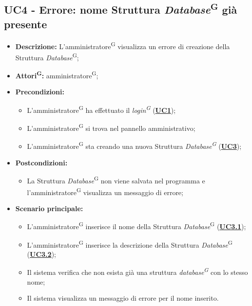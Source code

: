 \subsection{UC4 - Errore: nome Struttura \textit{Database}\textsuperscript{G} già presente}
\label{sec:UC4}
\begin{itemize}
	\item \textbf{Descrizione:} L’amministratore\textsuperscript{G} visualizza un errore di creazione della Struttura \textit{Database}\textsuperscript{G};
	\item \textbf{Attori\textsuperscript{G}:} amministratore\textsuperscript{G};
	\item \textbf{Precondizioni:} 
	\begin{itemize}
		\item L’amministratore\textsuperscript{G} ha effettuato il \textit{login\textsuperscript{G}} (\hyperref[sec:UC1]{\textbf{UC1}});
		\item L’amministratore\textsuperscript{G} si trova nel pannello amministrativo;
		\item L’amministratore\textsuperscript{G} sta creando una nuova Struttura \textit{Database\textsuperscript{G}} (\hyperref[sec:UC3]{\textbf{UC3}});
	\end{itemize}
	\item \textbf{Postcondizioni:} 
	\begin{itemize}
		\item La Struttura \textit{Database}\textsuperscript{G} non viene salvata nel programma e l'amministratore\textsuperscript{G} visualizza un messaggio di errore;
	\end{itemize}
	\item \textbf{Scenario principale:} 
	\begin{itemize}
		\item L’amministratore\textsuperscript{G} inserisce il nome della Struttura \textit{Database}\textsuperscript{G} (\hyperref[sec:UC3.1]{\textbf{UC3.1}});
		\item L’amministratore\textsuperscript{G} inserisce la descrizione della Struttura \textit{Database}\textsuperscript{G}  (\hyperref[sec:UC3.2]{\textbf{UC3.2}});
		\item Il sistema verifica che non esista già una struttura \textit{database\textsuperscript{G}} con lo stesso nome;
		\item Il sistema visualizza un messaggio di errore per il nome inserito.
	\end{itemize}
\end{itemize}

